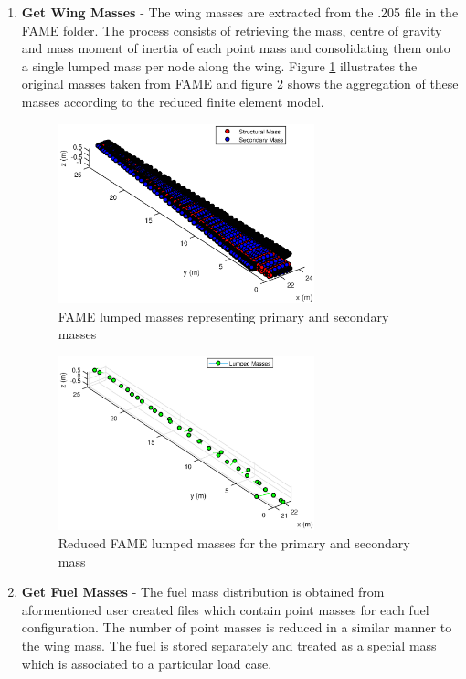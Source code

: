 \begin{enumerate}
\item \textbf{Get Wing Masses} - The wing masses are extracted from the .205 file in the FAME folder. The process consists of retrieving the mass, centre of gravity and mass moment of inertia of each point mass and consolidating them onto a single lumped mass per node along the wing. Figure \ref{fig:OriginalFAMEMasses} illustrates the original masses taken from FAME and figure \ref{fig:ReducedFAMEMasses} shows the aggregation of these masses according to the reduced finite element model.

\begin{figure}[h!]
\centering
\includegraphics[width = 0.7\textwidth]{OriginalFAMEMasses}
\caption{FAME lumped masses representing primary and secondary masses}\label{fig:OriginalFAMEMasses}
\end{figure}

\begin{figure}[h!]
\centering
\includegraphics[width = 0.7\textwidth]{ReducedFAMEMasses}
\caption{Reduced FAME lumped masses for the primary and secondary mass}\label{fig:ReducedFAMEMasses}
\end{figure}

\item \textbf{Get Fuel Masses} - The fuel mass distribution is obtained from aformentioned user created files which contain point masses for each fuel configuration. The number of point masses is reduced in a similar manner to the wing mass. The fuel is stored separately and treated as a special mass which is associated to a particular load case. 


\end{enumerate}
